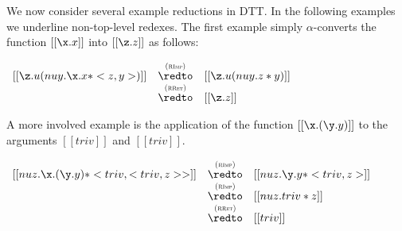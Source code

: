 We now consider several example reductions in DTT. In the following
examples we underline non-top-level redexes. The first example simply
$\alpha$-converts the function $[[\x.x]]$ into $[[\z.z]]$ as follows:
\begin{center}
  \begin{math}
    \begin{array}{lcl}    
      [[\z.u(nu y.\x.x * <z , y>)]] & \redtoby{RImp}   & [[\z.u(nu y.z *  y)]]\\
                                    & \redtoby{RRet}   & [[\z.z]]\\
    \end{array}
\end{math}
\end{center}
A more involved example is the application of the function
$[[\x.(\y.y)]]$ to the arguments $[[triv]]$ and $[[triv]]$. 
\begin{center}
  \begin{math}
    \begin{array}{lcl}
      [[nu z.\x.(\y.y) * <triv,<triv,z>>]] & \redtoby{RImp} & [[nu z.\y.y * <triv ,z>]]\\
      & \redtoby{RImp} & [[nu z.triv * z]]\\
      & \redtoby{RRet} & [[triv]]\\
    \end{array}
  \end{math}
\end{center}
